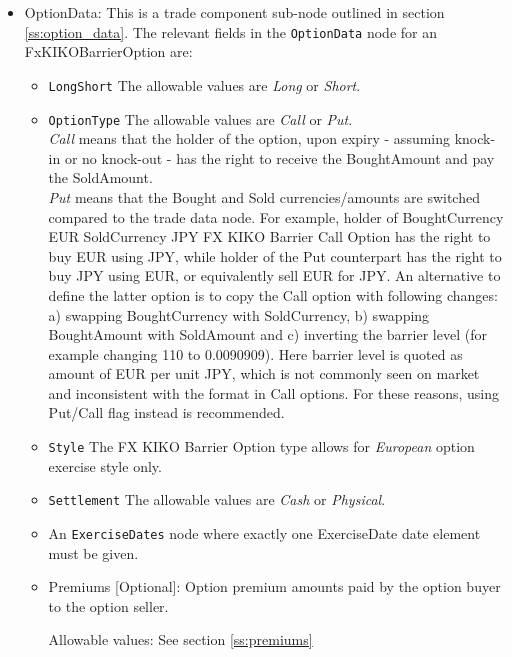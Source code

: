 \begin{itemize}

\item OptionData: This is a trade component sub-node outlined in section \ref{ss:option_data}. 
The relevant fields in the \lstinline!OptionData! node for an FxKIKOBarrierOption are:

\begin{itemize}
\item \lstinline!LongShort! The allowable values are \emph{Long} or \emph{Short}.

\item \lstinline!OptionType! The allowable values are \emph{Call} or \emph{Put}. \\
 \emph{Call} means that the holder of the option, upon expiry - assuming knock-in or no knock-out - has the right to receive the BoughtAmount and pay the SoldAmount. \\\emph{Put} means that the Bought and Sold currencies/amounts are switched compared to the trade data node. 
For example, holder of BoughtCurrency EUR SoldCurrency JPY FX KIKO Barrier Call Option has the right to buy EUR using JPY, while
holder of the Put counterpart has the right to buy JPY using EUR, or equivalently sell EUR for JPY. An alternative to define the latter option is to copy the Call option with following changes:\\
a) swapping BoughtCurrency with SoldCurrency, b) swapping BoughtAmount with SoldAmount and c) inverting the barrier level (for example changing 110 to 0.0090909). Here barrier level is
quoted as amount of EUR per unit JPY, which is not commonly seen on market and inconsistent with the format in Call options. For these reasons, using Put/Call flag instead is recommended.

\item  \lstinline!Style! The FX KIKO Barrier Option type allows for \emph{European} option exercise style only.

\item  \lstinline!Settlement! The allowable values are \emph{Cash} or \emph{Physical}.

\item An \lstinline!ExerciseDates! node where exactly one ExerciseDate date element must be given.

\item Premiums [Optional]: Option premium amounts paid by the option buyer to the option seller.

Allowable values:  See section \ref{ss:premiums}


\end{itemize}
\end{itemize}
